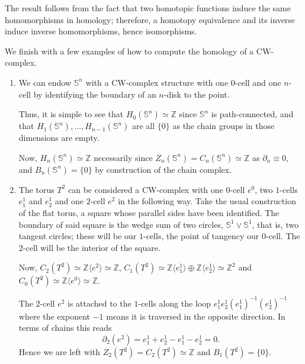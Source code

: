 The result follows from the fact that two homotopic functions induce the same homomorphisms in homology; therefore, a homotopy equivalence and its inverse induce inverse homomorphisms, hence isomorphisms.

We finish with a few examples of how to compute the homology of a CW-complex.

\begin{example}\label{ejemplos_hom_celular}
    \hfill
    \begin{enumerate}[label=(\roman*)]
        \item We can endow $\mathbb{S}^n$ with a CW-complex structure with one $0$-cell and one $n$-cell by identifying the boundary of an $n$-disk to the point.

        Thus, it is simple to see that $H_0(\mathbb{S}^n)\simeq \mathbb{Z}$ since $\mathbb{S}^n$ is path-connected, and that $H_1(\mathbb{S}^n), \dots, H_{n-1}(\mathbb{S}^n)$ are all $\{0\}$ as the chain groups in those dimensions are empty. %

        Now, $H_{n}(\mathbb{S}^n)\simeq \mathbb{Z}$ necessarily since $Z_n(\mathbb{S}^n)=C_n(\mathbb{S}^n)\simeq \mathbb{Z}$ as $\partial_n \equiv 0$, and $B_n(\mathbb{S}^n)=\{0\}$ by construction of the chain complex.
        \item The torus $T^2$ can be considered a CW-complex with one $0$-cell $e^0$, two $1$-cells $e^1_1$ and $e^1_2$ and one $2$-cell $e^2$ in the following way. Take the usual construction of the flat torus, a square whose parallel sides have been identified. The boundary of said square is the wedge sum of two circles, $\mathbb{S}^1\vee \mathbb{S}^1$, that is, two tangent circles; these will be our $1$-cells, the point of tangency our $0$-cell. The $2$-cell will be the interior of the square.

        Now, $C_2(T^2)\simeq \mathbb{Z}\langle e^2 \rangle \simeq \mathbb{Z}$, $C_1(T^2)\simeq \mathbb{Z}\langle e^1_1 \rangle \oplus \mathbb{Z}\langle e^1_2 \rangle \simeq \mathbb{Z}^2$ and $C_0(T^2)\simeq \mathbb{Z}\langle e^0 \rangle\simeq \mathbb{Z}$.

        The $2$-cell $e^2$ is attached to the $1$-cells along the loop $e^1_1 e^1_2 (e^1_1)^{-1} (e^1_2)^{-1} $ where the exponent $-1$ means it is traversed in the opposite direction. In terms of chains this reads
        \begin{equation*}
            \partial_2(e^2) = e^1_1 + e^1_2 - e^1_1 - e^1_2 = 0.
        \end{equation*}
        Hence we are left with $Z_2(T^2)=C_2(T^2)\simeq \mathbb{Z}$ and $B_1(T^2)=\{0\}$.


\end{enumerate}
\end{example}
